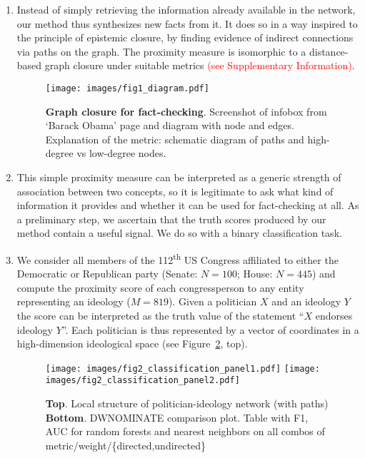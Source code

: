 \documentclass[10pt, letterpaper, english]{nature}
\begin{document}
\begin{enumerate}
    \item Instead of simply retrieving the information already available in the
        network, our method thus synthesizes new facts from it. It does so in a
        way inspired to the principle of epistemic closure, by finding evidence
        of indirect connections via paths on the graph. The proximity measure is
        isomorphic to a distance-based graph closure under suitable metrics
        \textcolor{red}{(see Supplementary Information)}.

\begin{figure}
    \centering
    \texttt{[image: images/fig1\_diagram.pdf]}
    \caption{\textbf{Graph closure for fact-checking}. Screenshot of infobox
    from `Barack Obama' page and diagram with node and edges. Explanation of the
    metric: schematic diagram of paths and high-degree vs low-degree nodes.}
    \label{fig:fig1_diagram}
\end{figure}

    \item This simple proximity measure can be interpreted as a generic strength
        of association between two concepts, so it is legitimate to ask what
        kind of information it provides and whether it can be used for
        fact-checking at all. As a preliminary step, we ascertain that the truth
        scores produced by our method contain a useful signal. We do so with a
        binary classification task.

    \item We consider all members of the 112\textsuperscript{th} US Congress
        affiliated to either the Democratic or Republican party (Senate: $N =
        100$; House: $N = 445$) and compute the proximity score of each
        congressperson to any entity representing an ideology ($M=819$). Given a
        politician $X$ and an ideology $Y$ the score can be interpreted as the
        truth value of the statement ``$X$ endorses ideology $Y$''. Each
        politician is thus represented by a vector of coordinates in a
        high-dimension ideological space (see
        Figure~\ref{fig:fig2_classification}, top). 

\begin{figure}
    \centering
    \texttt{[image: images/fig2\_classification\_panel1.pdf]}
    \texttt{[image: images/fig2\_classification\_panel2.pdf]}
    \caption{\textbf{Top}. Local structure of politician-ideology
    network (with paths) \textbf{Bottom}. DWNOMINATE comparison plot. Table
    with F1, AUC for random forests and nearest neighbors on all combos of
    metric/weight/\{directed,undirected\}} 
    \label{fig:fig2_classification}
\end{figure}


\end{enumerate}
\end{document}
